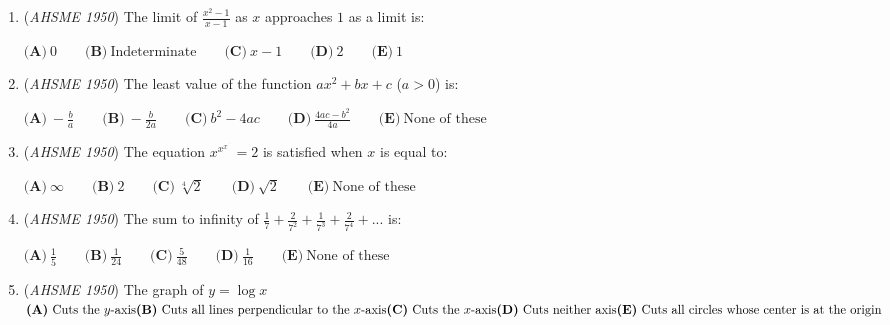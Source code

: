 \begin{enumerate}
 (1) the sum increases without limit


 (2) the sum decreases without limit


 (3) the difference between any term of the sequence and zero can be made less than any positive quantity no matter how small


 (4) the difference between the sum and 4 can be made less than any positive quantity no matter how small


 (5) the sum approaches a limit


 Of these statements, the correct ones are:


 $\textbf{(A)}\ \text{Only }3\text{ and }4\qquad\textbf{(B)}\ \text{Only }5\qquad\textbf{(C)}\ \text{Only }2\text{ and }4\qquad\textbf{(D)}\ \text{Only }2,3\text{ and }4\qquad\textbf{(E)}\ \text{Only }4\text{ and }5$


	\item (\textit{AHSME 1950}) The limit of $\frac{x^{2}-1}{x-1}$ as $x$ approaches $1$ as a limit is:


 $\textbf{(A)}\ 0\qquad\textbf{(B)}\ \text{Indeterminate}\qquad\textbf{(C)}\ x-1\qquad\textbf{(D)}\ 2\qquad\textbf{(E)}\ 1$


	\item (\textit{AHSME 1950}) The least value of the function $ax^2+bx+c$ ($a>0$) is:


 $\textbf{(A)}\ -\frac{b}{a}\qquad\textbf{(B)}\ -\frac{b}{2a}\qquad\textbf{(C)}\ b^{2}-4ac\qquad\textbf{(D)}\ \frac{4ac-b^{2}}{4a}\qquad\textbf{(E)}\ \text{None of these}$


	\item (\textit{AHSME 1950}) The equation $x^{x^{x^{.^{.^.}}}}=2$ is satisfied when $x$ is equal to:


 $\textbf{(A)}\ \infty\qquad\textbf{(B)}\ 2\qquad\textbf{(C)}\ \sqrt[4]{2}\qquad\textbf{(D)}\ \sqrt{2}\qquad\textbf{(E)}\ \text{None of these}$


	\item (\textit{AHSME 1950}) The sum to infinity of $\frac{1}{7}+\frac{2}{7^{2}}+\frac{1}{7^{3}}+\frac{2}{7^{4}}+...$ is:


 $\textbf{(A)}\ \frac{1}{5}\qquad\textbf{(B)}\ \frac{1}{24}\qquad\textbf{(C)}\ \frac{5}{48}\qquad\textbf{(D)}\ \frac{1}{16}\qquad\textbf{(E)}\ \text{None of these}$


	\item (\textit{AHSME 1950}) The graph of $y=\log x$
$\textbf{(A)}\ \text{Cuts the }y\text{-axis}\qquad\\ \textbf{(B)}\ \text{Cuts all lines perpendicular to the }x\text{-axis}\qquad\\ \textbf{(C)}\ \text{Cuts the }x\text{-axis}\qquad\\ \textbf{(D)}\ \text{Cuts neither axis}\qquad\\ \textbf{(E)}\ \text{Cuts all circles whose center is at the origin}$



\end{enumerate}
